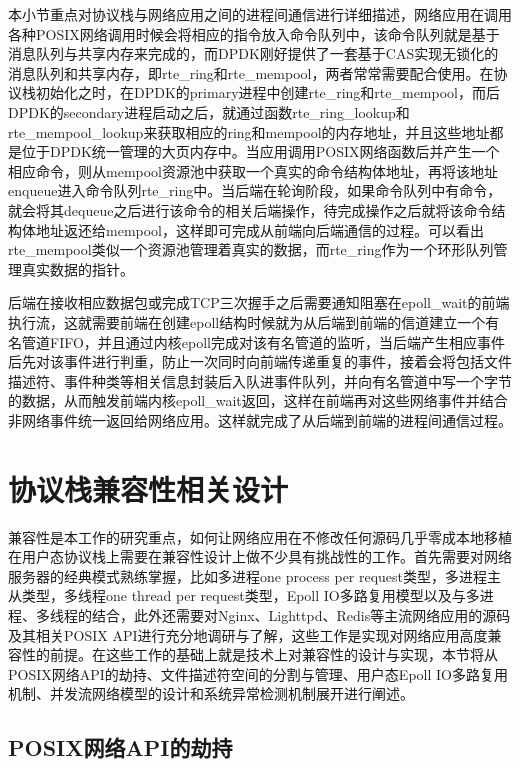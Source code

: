 本小节重点对协议栈与网络应用之间的进程间通信进行详细描述，网络应用在调用各种POSIX网络调用时候会将相应的指令放入命令队列中，该命令队列就是基于消息队列与共享内存来完成的，而DPDK刚好提供了一套基于CAS实现无锁化的消息队列和共享内存，即rte\_ring和rte\_mempool，两者常常需要配合使用。在协议栈初始化之时，在DPDK的primary进程中创建rte\_ring和rte\_mempool，而后DPDK的secondary进程启动之后，就通过函数rte\_ring\_lookup和rte\_mempool\_lookup来获取相应的ring和mempool的内存地址，并且这些地址都是位于DPDK统一管理的大页内存中。当应用调用POSIX网络函数后并产生一个相应命令，则从mempool资源池中获取一个真实的命令结构体地址，再将该地址enqueue进入命令队列rte\_ring中。当后端在轮询阶段，如果命令队列中有命令，就会将其dequeue之后进行该命令的相关后端操作，待完成操作之后就将该命令结构体地址返还给mempool，这样即可完成从前端向后端通信的过程。可以看出rte\_mempool类似一个资源池管理着真实的数据，而rte\_ring作为一个环形队列管理真实数据的指针。

后端在接收相应数据包或完成TCP三次握手之后需要通知阻塞在epoll\_wait的前端执行流，这就需要前端在创建epoll结构时候就为从后端到前端的信道建立一个有名管道FIFO，并且通过内核epoll完成对该有名管道的监听，当后端产生相应事件后先对该事件进行判重，防止一次同时向前端传递重复的事件，接着会将包括文件描述符、事件种类等相关信息封装后入队进事件队列，并向有名管道中写一个字节的数据，从而触发前端内核epoll\_wait返回，这样在前端再对这些网络事件并结合非网络事件统一返回给网络应用。这样就完成了从后端到前端的进程间通信过程。

\section{协议栈兼容性相关设计}

兼容性是本工作的研究重点，如何让网络应用在不修改任何源码几乎零成本地移植在用户态协议栈上需要在兼容性设计上做不少具有挑战性的工作。首先需要对网络服务器的经典模式熟练掌握，比如多进程one process per request类型，多进程主从类型，多线程one thread per request类型，Epoll IO多路复用模型以及与多进程、多线程的结合，此外还需要对Nginx、Lighttpd、Redis等主流网络应用的源码及其相关POSIX API进行充分地调研与了解，这些工作是实现对网络应用高度兼容性的前提。在这些工作的基础上就是技术上对兼容性的设计与实现，本节将从POSIX网络API的劫持、文件描述符空间的分割与管理、用户态Epoll IO多路复用机制、并发流网络模型的设计和系统异常检测机制展开进行阐述。

\subsection{POSIX网络API的劫持}

